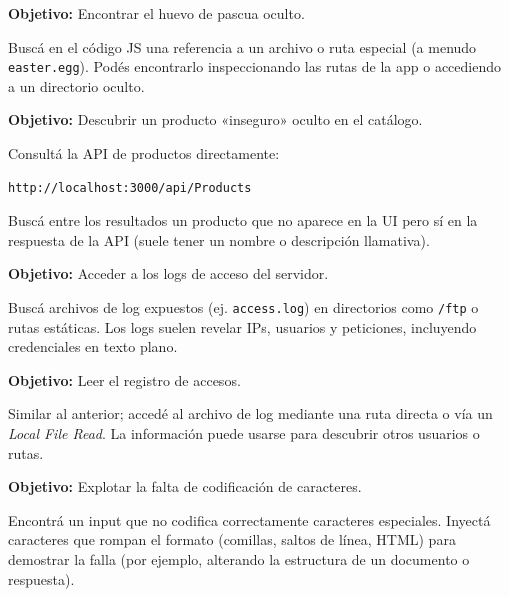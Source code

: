 \documentclass[11pt,a4paper]{article}
\begin{document}
\begin{desafio}
\textbf{Objetivo:} Encontrar el huevo de pascua oculto.
\begin{solucion}
Buscá en el código JS una referencia a un archivo o ruta especial (a menudo \texttt{easter.egg}). Podés encontrarlo inspeccionando las rutas de la app o accediendo a un directorio oculto.
\end{solucion}
\end{desafio}

\begin{desafio}
\textbf{Objetivo:} Descubrir un producto «inseguro» oculto en el catálogo.
\begin{solucion}
Consultá la API de productos directamente:
\begin{lstlisting}
http://localhost:3000/api/Products
\end{lstlisting}
Buscá entre los resultados un producto que no aparece en la UI pero sí en la respuesta de la API (suele tener un nombre o descripción llamativa).
\end{solucion}
\end{desafio}

\begin{desafio}
\textbf{Objetivo:} Acceder a los logs de acceso del servidor.
\begin{solucion}
Buscá archivos de log expuestos (ej. \texttt{access.log}) en directorios como \texttt{/ftp} o rutas estáticas. Los logs suelen revelar IPs, usuarios y peticiones, incluyendo credenciales en texto plano.
\end{solucion}
\end{desafio}

\begin{desafio}
\textbf{Objetivo:} Leer el registro de accesos.
\begin{solucion}
Similar al anterior; accedé al archivo de log mediante una ruta directa o vía un \textit{Local File Read}. La información puede usarse para descubrir otros usuarios o rutas.
\end{solucion}
\end{desafio}

\begin{desafio}
\textbf{Objetivo:} Explotar la falta de codificación de caracteres.
\begin{solucion}
Encontrá un input que no codifica correctamente caracteres especiales. Inyectá caracteres que rompan el formato (comillas, saltos de línea, HTML) para demostrar la falla (por ejemplo, alterando la estructura de un documento o respuesta).
\end{solucion}
\end{desafio}
\end{document}
